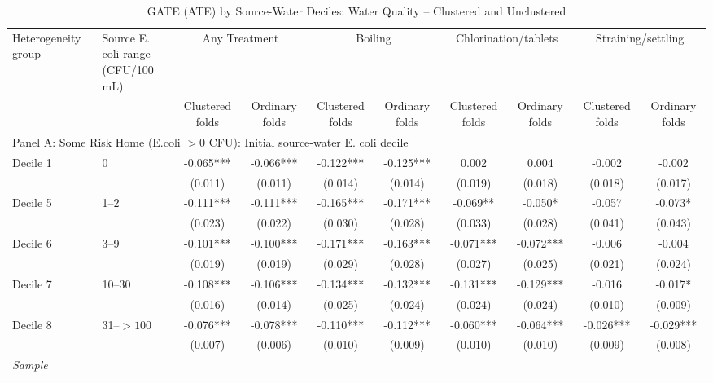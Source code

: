 \begin{landscape}
\begin{table}[p]
\centering
\caption{GATE (ATE) by Source-Water Deciles: Water Quality -- Clustered and Unclustered}
\label{tab:table_gate_appendix_deciles-ecoli}
\scriptsize\setlength{\tabcolsep}{4pt}
\begin{adjustbox}{max width=\linewidth, center}
\begin{tabular}{llcccccccc}
\toprule
Heterogeneity group & \shortstack{Source E. coli range\\(CFU/100 mL)} & \multicolumn{2}{c}{Any Treatment} & \multicolumn{2}{c}{Boiling} & \multicolumn{2}{c}{Chlorination/tablets} & \multicolumn{2}{c}{Straining/settling} \\
 &  & Clustered folds & Ordinary folds & Clustered folds & Ordinary folds & Clustered folds & Ordinary folds & Clustered folds & Ordinary folds \\
\midrule
\multicolumn{10}{l}{Panel A: Some Risk Home (E.coli $>0$ CFU): Initial source-water E. coli decile} \\
Decile 1 & 0 & -0.065*** & -0.066*** & -0.122*** & -0.125*** & 0.002 & 0.004 & -0.002 & -0.002 \\
 &  & (0.011) & (0.011) & (0.014) & (0.014) & (0.019) & (0.018) & (0.018) & (0.017) \\
Decile 5 & 1--2 & -0.111*** & -0.111*** & -0.165*** & -0.171*** & -0.069** & -0.050* & -0.057 & -0.073* \\
 &  & (0.023) & (0.022) & (0.030) & (0.028) & (0.033) & (0.028) & (0.041) & (0.043) \\
Decile 6 & 3--9 & -0.101*** & -0.100*** & -0.171*** & -0.163*** & -0.071*** & -0.072*** & -0.006 & -0.004 \\
 &  & (0.019) & (0.019) & (0.029) & (0.028) & (0.027) & (0.025) & (0.021) & (0.024) \\
Decile 7 & 10--30 & -0.108*** & -0.106*** & -0.134*** & -0.132*** & -0.131*** & -0.129*** & -0.016 & -0.017* \\
 &  & (0.016) & (0.014) & (0.025) & (0.024) & (0.024) & (0.024) & (0.010) & (0.009) \\
Decile 8 & 31--$>100$ & -0.076*** & -0.078*** & -0.110*** & -0.112*** & -0.060*** & -0.064*** & -0.026*** & -0.029*** \\
 &  & (0.007) & (0.006) & (0.010) & (0.009) & (0.010) & (0.010) & (0.009) & (0.008) \\
\multicolumn{10}{l}{\textit{Sample}} \\

\end{tabular}
\end{adjustbox}
\end{table}
\end{landscape}
